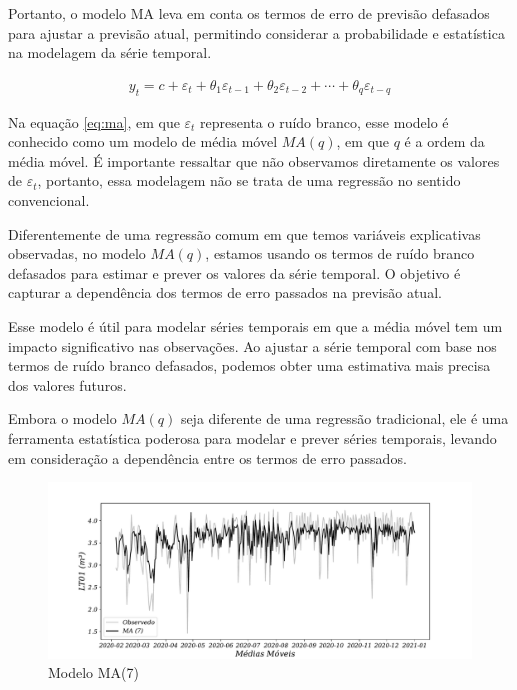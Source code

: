Portanto, o modelo MA leva em conta os termos de erro de previsão defasados para ajustar a previsão atual, permitindo considerar a probabilidade e estatística na modelagem da série temporal.


\begin{eqnarray}
	y_t=c+\varepsilon_t+\theta_1 \varepsilon_{t-1}+\theta_2 \varepsilon_{t-2}+\cdots+\theta_q \varepsilon_{t-q}\label{eq:ma}
\end{eqnarray}

Na equação \eqref{eq:ma}, em que $\varepsilon_t$ representa o ruído branco, esse modelo é conhecido como um modelo de média móvel $MA(q)$, em que $q$ é a ordem da média móvel. É importante ressaltar que não observamos diretamente os valores de $\varepsilon_t$, portanto, essa modelagem não se trata de uma regressão no sentido convencional.

Diferentemente de uma regressão comum em que temos variáveis explicativas observadas, no modelo $MA(q)$, estamos usando os termos de ruído branco defasados para estimar e prever os valores da série temporal. O objetivo é capturar a dependência dos termos de erro passados na previsão atual.

Esse modelo é útil para modelar séries temporais em que a média móvel tem um impacto significativo nas observações. Ao ajustar a série temporal com base nos termos de ruído branco defasados, podemos obter uma estimativa mais precisa dos valores futuros.

Embora o modelo $MA(q)$ seja diferente de uma regressão tradicional, ele é uma ferramenta estatística poderosa para modelar e prever séries temporais, levando em consideração a dependência entre os termos de erro passados.

\begin{figure}[H]
	\centering
	\caption{Modelo MA(7) }
	\label{fig:1-ma}
	\includegraphics[width=0.9\linewidth]{Modelos/Figuras/0-MA}
	
\end{figure}

